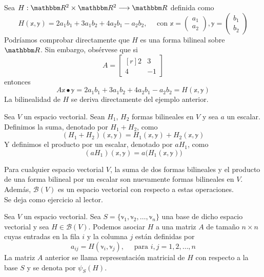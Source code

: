 \begin{example}\label{example:bil_2}
    Sea $H: \RR[2] \times \RR[2] \longrightarrow \RR$ definida como
    $$H(\mathbb{x}, \mathbb{y}) = 2a_1b_1 + 3a_1b_2 + 4a_2b_1 - a_2b_2, \quad \text{ con } \mathbb{x} = \begin{pmatrix} a_1 \\ a_2 \end{pmatrix}, \mathbb{y} = \begin{pmatrix} b_1 \\ b_2 \end{pmatrix}$$
    Podríamos comprobar directamente que $H$ es una forma bilineal sobre $\RR$. Sin embargo, obsérvese que si
    $$A = \begin{bmatrix*}[r]
        2 & 3 \\
        4 & -1
    \end{bmatrix*}$$
    entonces
    $$A\mathbb{x} \bullet \mathbb{y} = 2a_1b_1 + 3a_1b_2 + 4a_2b_1 - a_2b_2 = H(\mathbb{x}, \mathbb{y})$$
    La bilinealidad de $H$ se deriva directamente del ejemplo anterior.
\end{example}

\newpage

\begin{definition}
    Sea $V$ un espacio vectorial. Sean $H_1$, $H_2$ formas bilineales en $V$ y sea $a$ un escalar. Definimos la suma, denotado por $H_1 + H_2$, como
    $$(H_1 + H_2)(\mathbb{x}, \mathbb{y}) = H_1(\mathbb{x}, \mathbb{y}) + H_2(\mathbb{x}, \mathbb{y})$$
    Y definimos el producto por un escalar, denotado por $aH_1$, como
    $$(aH_1)(\mathbb{x}, \mathbb{y}) = a \big( H_1(\mathbb{x}, \mathbb{y}) \big)$$
\end{definition}

\begin{theorem}
    Para cualquier espacio vectorial $V$, la suma de dos formas bilineales y el producto de una forma bilineal por un escalar son nuevamente formas bilineales en $V$. Además, $\mathcal{B}(V)$ es un espacio vectorial con respecto a estas operaciones. \\
    \demostracion Se deja como ejercicio al lector.
\end{theorem}

\begin{definition}
    Sea $V$ un espacio vectorial. Sea $S = \{ \mathbb{v}_1, \mathbb{v}_2, \dots, \mathbb{v}_n \}$ una base de dicho espacio vectorial y sea $H \in \mathcal{B}(V)$. Podemos asociar $H$ a una matriz $A$ de tamaño $n \times n$ cuyas entradas en la fila $i$ y la columna $j$ están definidas por
    $$a_{ij} = H(\mathbb{v}_i, \mathbb{v}_j), \quad \text{ para } i, j = 1, 2, \dots, n$$
    La matriz $A$ anterior se llama representación matricial de $H$ con respecto a la base $S$ y se denota por $\psi_S(H)$.
\end{definition}

